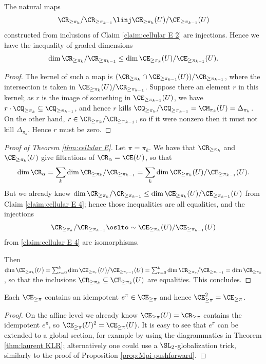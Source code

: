 \documentclass[11pt,reqno]{amsart}
\begin{document}
\begin{claim}\label{claim:cellular E 4}
    The natural maps $$\CR_{\ge\pi_k}/\CR_{\ge\pi_{k-1}}\linj \CE_{\ge\pi_k}(U)/\CE_{\ge\pi_{k-1}}(U)$$ constructed from inclusions of Claim \ref{claim:cellular E 2} are injections. Hence we have the inequality of graded dimensions $$\dim \CR_{\ge\pi_k}/\CR_{\ge\pi_{k-1}}\le\dim \CE_{\ge\pi_k}(U)/\CE_{\ge\pi_{k-1}}(U).$$
\end{claim}
\begin{proof}
    The kernel of such a map is $(\CR_{\ge\pi_k}\cap \CE_{\ge\pi_{k-1}}(U))/\CR_{\ge\pi_{k-1}}$, where the intersection is taken in $\CE_{\ge\pi_k}(U)/\CR_{\ge\pi_{k-1}}$. Suppose there an element $r$ in this kernel; as $r$ is the image of something in $\CE_{\ge\pi_{k-1}}(U)$, we have $r\cdot\CQ_{\ge\pi_k}\subseteq\CQ_{\ge\pi_{k-1}}$, and hence $r$ kills $\CQ_{\ge\pi_k}/\CQ_{\ge\pi_{k-1}}=\CM_{\pi_k}(U)=\Delta_{\pi_k}$. On the other hand, $r\in\CR_{\ge\pi_k}/\CR_{\ge\pi_{k-1}}$, so if it were nonzero then it must not kill $\Delta_{\pi_k}$. Hence $r$ must be zero.
\end{proof}
\begin{proof}[Proof of Theorem \ref{thm:cellular E}]
    Let $\pi=\pi_k$. We have that $\CR_{\ge\pi_k}$ and $\CE_{\ge\pi_k}(U)$ give filtrations of $\CR_\alpha=\CE(U)$, so that
    \[\dim \CR_\alpha=\sum_k \dim \CR_{\ge\pi_k}/\CR_{\ge\pi_{k-1}}=\sum_k \dim \CE_{\ge\pi_k}(U)/\CE_{\ge\pi_{k-1}}(U).\]
    But we already knew $\dim \CR_{\ge\pi_k}/\CR_{\ge\pi_{k-1}}\le\dim \CE_{\ge\pi_k}(U)/\CE_{\ge\pi_{k-1}}(U)$ from Claim \ref{claim:cellular E 4}; hence those inequalities are all equalities, and the injections 
    \[\CR_{\ge\pi_k}/\CR_{\ge\pi_{k-1}}\simlto \CE_{\ge\pi_k}(U)/\CE_{\ge\pi_{k-1}}(U)\]
    from \ref{claim:cellular E 4} are isomorphisms. 

    Then $\dim \CE_{\ge\pi_k}(U)=\sum_{r=0}^k \dim \CE_{\ge\pi_r}(U)/\CE_{\ge\pi_{r-1}}(U)=\sum_{r=0}^k\dim\CR_{\ge\pi_r}/\CR_{\ge\pi_{r-1}}=\dim\CR_{\ge\pi_k}$, so that the inclusions $\CR_{\ge\pi_k}\subseteq \CE_{\ge\pi_k}(U)$ are equalities. This concludes.
\end{proof}



\begin{corollary}
    Each $\CE_{\ge\pi}$ contains an idempotent $e^\pi\in\CE_{\ge\pi}$ and hence $\CE_{\ge\pi}^2=\CE_{\ge\pi}$. 
\end{corollary}
\begin{proof}
    On the affine level we already know $\CE_{\ge\pi}(U)=\CR_{\ge\pi}$ contains the idempotent $e^\pi$, so $\CE_{\ge\pi}(U)^2=\CE_{\ge\pi}(U)$. It is easy to see that $e^\pi$ can be extended to a global section, for example by using the diagrammatics in Theorem \ref{thm:laurent KLR}; alternatively one could use a $\SL_2$-globalization trick, similarly to the proof of Proposition \ref{prop:Mpi-pushforward}.
\end{proof}
\end{document}

